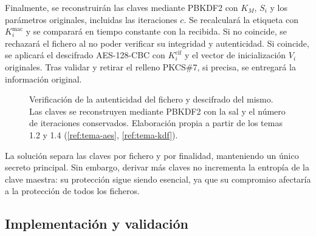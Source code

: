 Finalmente, se reconstruirán las claves mediante PBKDF2 con $K_M$, $S_i$ y los parámetros originales, incluidas las iteraciones $c$.
Se recalculará la etiqueta con $K_i^{\mathrm{mac}}$ y se comparará en tiempo constante con la recibida. Si no coincide, se rechazará el fichero al no poder verificar su integridad y autenticidad.
Si coincide, se aplicará el descifrado AES-128-CBC con $K_i^{\mathrm{cif}}$ y el vector de inicialización $V_i$ originales. Tras validar y retirar el relleno PKCS\#7, si precisa, se entregará la información original.

\begin{figure}[H]
  \centering
  \resizebox{\linewidth}{!}{}
  \caption{Verificación de la autenticidad del fichero y descifrado del mismo. Las claves se reconstruyen mediante PBKDF2 con la sal y el número de iteraciones conservados. Elaboración propia a partir de los temas 1.2 y 1.4 (\ref{ref:tema-aes}, \ref{ref:tema-kdf}).}
  \label{fig:p1-descifrado}
\end{figure}

La solución separa las claves por fichero y por finalidad, manteniendo un único secreto principal.
Sin embargo, derivar más claves no incrementa la entropía de la clave maestra: su protección sigue siendo esencial, ya que su compromiso afectaría a la protección de todos los ficheros.


\subsection{Implementación y validación}

